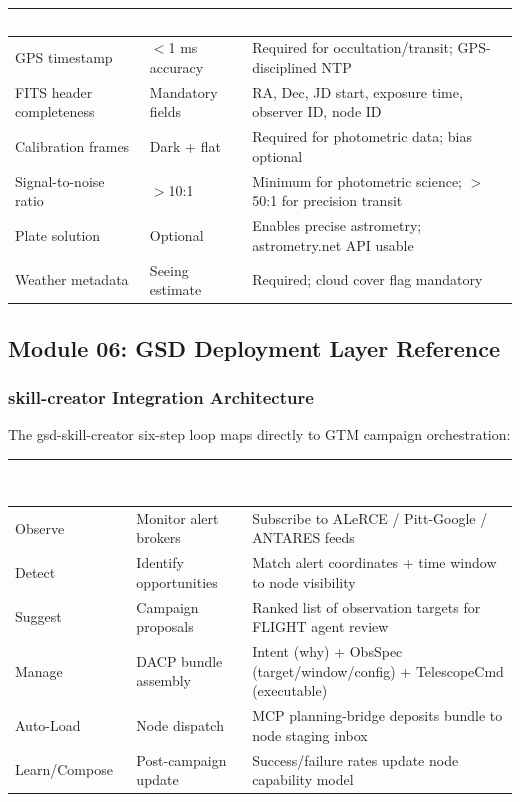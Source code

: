 \documentclass[11pt,letterpaper]{article}
\newcommand{\tableheader}[1]{\textbf{\sffamily\textcolor{white}{#1}}}
\begin{document}
\begin{center}
\begin{tabularx}{\textwidth}{L{4cm}L{3cm}X}
\toprule
{}
\tableheader{Quality Gate} & \tableheader{Threshold} & \tableheader{Notes} \\
\midrule
GPS timestamp & $<$1 ms accuracy & Required for occultation/transit; GPS-disciplined NTP \\
FITS header completeness & Mandatory fields & RA, Dec, JD start, exposure time, observer ID, node ID \\
Calibration frames & Dark + flat & Required for photometric data; bias optional \\
Signal-to-noise ratio & $>$10:1 & Minimum for photometric science; $>$50:1 for precision transit \\
Plate solution & Optional & Enables precise astrometry; astrometry.net API usable \\
Weather metadata & Seeing estimate & Required; cloud cover flag mandatory \\
\bottomrule
\end{tabularx}
\end{center}

\subsection{Module 06: GSD Deployment Layer Reference}

\subsubsection{skill-creator Integration Architecture}

The gsd-skill-creator six-step loop maps directly to GTM campaign orchestration:

\begin{center}
\begin{tabularx}{\textwidth}{L{2.5cm}L{2.5cm}X}
\toprule
{}
\tableheader{Skill-Creator Step} & \tableheader{GTM Mapping} & \tableheader{Implementation} \\
\midrule
Observe & Monitor alert brokers & Subscribe to ALeRCE / Pitt-Google / ANTARES feeds \\
Detect & Identify opportunities & Match alert coordinates + time window to node visibility \\
Suggest & Campaign proposals & Ranked list of observation targets for FLIGHT agent review \\
Manage & DACP bundle assembly & Intent (why) + ObsSpec (target/window/config) + TelescopeCmd (executable) \\
Auto-Load & Node dispatch & MCP planning-bridge deposits bundle to node staging inbox \\
Learn/Compose & Post-campaign update & Success/failure rates update node capability model \\
\bottomrule
\end{tabularx}
\end{center}
\end{document}
